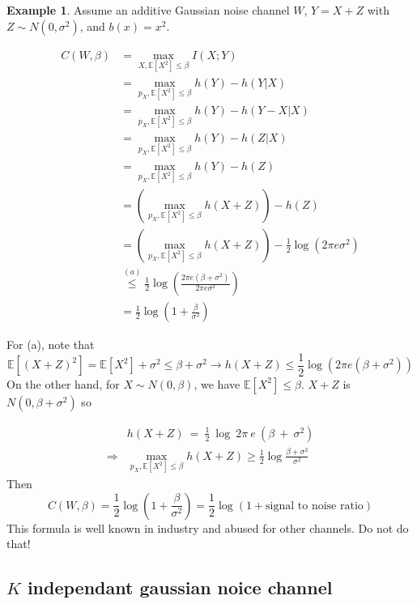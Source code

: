 \documentclass[twoside]{article}
\theoremstyle{definition} %
\newtheorem{example}{Example}
\newcommand{\Ex}[1]{\mathbb{E}\left[#1\right]}
\newcommand{\pfrac}[2]{\left( \frac{#1}{#2} \right)}
\begin{document}
\begin{example}
  Assume an additive Gaussian noise channel $W$, $Y=X+Z$ with $Z \sim N(0, \sigma^2)$, and $b(x) = x^2$.

  \begin{align*}
    C(W, \beta) &= \max_{X, \Ex{X^2} \leq \beta} I(X;Y) \\
    &= \max_{p_X, \Ex{X^2} \leq \beta} h(Y) - h(Y|X) \\
    &= \max_{p_X, \Ex{X^2} \leq \beta} h(Y) - h(Y-X|X) \\
    &= \max_{p_X, \Ex{X^2} \leq \beta} h(Y) - h(Z|X) \\
    &= \max_{p_X, \Ex{X^2} \leq \beta} h(Y) - h(Z) \\
    &= \left(\max_{p_X, \Ex{X^2} \leq \beta} h(X+Z)\right) - h(Z) \\
    &= \left(\max_{p_X, \Ex{X^2} \leq \beta} h(X+Z)\right) - \frac 1 2 \log(2\pi e \sigma^2) \\
    &\overset{(a)}\leq \frac 1 2 \log \pfrac{2\pi e (\beta + \sigma^2)}{2\pi e\sigma^2}\\
    &= \frac 1 2 \log \left(1 + \frac \beta {\sigma^2}\right)
  \end{align*}

  For (a), note that
  \[
    \Ex{(X+Z)^2} = \Ex{X^2} + \sigma^2 \leq \beta + \sigma^2 \to h(X+Z) \leq \frac 1 2 \log (2\pi e (\beta + \sigma^2))
  \]
  On the other hand, for $X \sim N(0, \beta)$, we have $\Ex{X^2}\leq \beta$. $X+Z$ is $N(0, \beta+\sigma^2)$ so

  \begin{align*}
    &h(X+Z)~=~\frac 1 2~\log~2\pi~e~(\beta~+~\sigma^2)\\
\Rightarrow&\max_{p_X, \Ex{X^2} \leq \beta} h(X+Z) \geq \frac 1 2 \log \frac {\beta + \sigma^2} {\sigma^2}
  \end{align*}
  Then
  \[
    C(W,\beta)= \frac 1 2 \log\left(1 + \frac \beta {\sigma^2} \right) = \frac 1 2 \log(1 + \text{signal to noise ratio})
  \]
  This formula is well known in industry and abused for other channels. Do not do that!
\end{example}




\subsection{$K$ independant gaussian noice channel}
\end{document}
